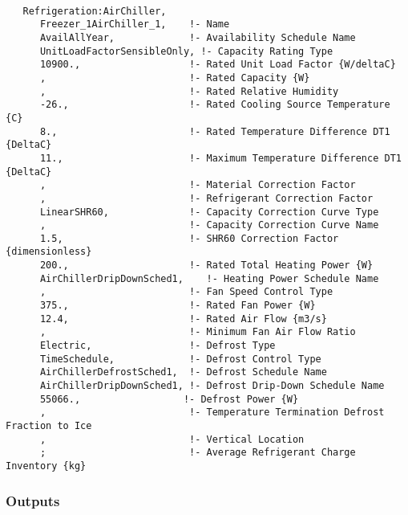 \begin{lstlisting}

   Refrigeration:AirChiller,
      Freezer_1AirChiller_1,    !- Name
      AvailAllYear,             !- Availability Schedule Name
      UnitLoadFactorSensibleOnly, !- Capacity Rating Type
      10900.,                   !- Rated Unit Load Factor {W/deltaC}
      ,                         !- Rated Capacity {W}
      ,                         !- Rated Relative Humidity
      -26.,                     !- Rated Cooling Source Temperature {C}
      8.,                       !- Rated Temperature Difference DT1 {DeltaC}
      11.,                      !- Maximum Temperature Difference DT1 {DeltaC}
      ,                         !- Material Correction Factor
      ,                         !- Refrigerant Correction Factor
      LinearSHR60,              !- Capacity Correction Curve Type
      ,                         !- Capacity Correction Curve Name
      1.5,                      !- SHR60 Correction Factor {dimensionless}
      200.,                     !- Rated Total Heating Power {W}
      AirChillerDripDownSched1,    !- Heating Power Schedule Name
      ,                         !- Fan Speed Control Type
      375.,                     !- Rated Fan Power {W}
      12.4,                     !- Rated Air Flow {m3/s}
      ,                         !- Minimum Fan Air Flow Ratio
      Electric,                 !- Defrost Type
      TimeSchedule,             !- Defrost Control Type
      AirChillerDefrostSched1,  !- Defrost Schedule Name
      AirChillerDripDownSched1, !- Defrost Drip-Down Schedule Name
      55066.,                  !- Defrost Power {W}
      ,                         !- Temperature Termination Defrost Fraction to Ice
      ,                         !- Vertical Location
      ;                         !- Average Refrigerant Charge Inventory {kg}
\end{lstlisting}

\subsubsection{Outputs}\label{outputs-12-005}

